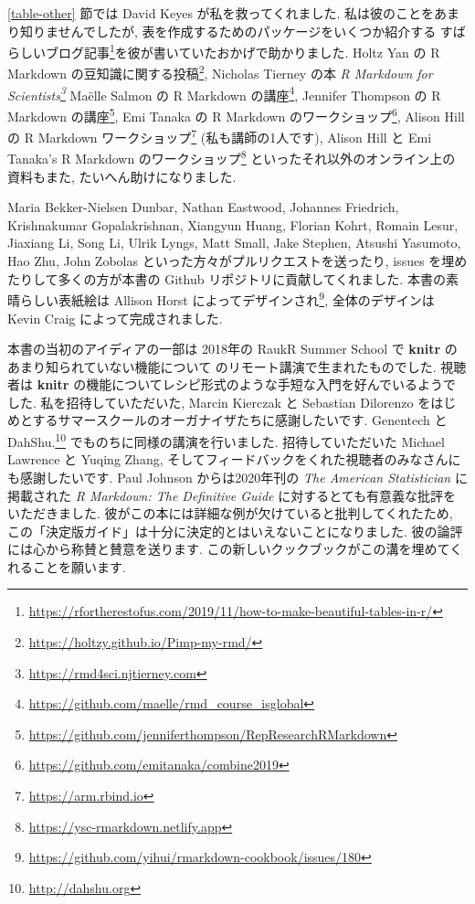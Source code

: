 \documentclass[
  11pt,
  lualatex,
  ja=standard]{bxjsreport}
\renewcommand{\href}[2]{#2\footnote{\url{#1}}}
\begin{document}
\ref{table-other} 節では David Keyes が私を救ってくれました. 私は彼のことをあまり知りませんでしたが, 表を作成するためのパッケージをいくつか紹介する \href{https://rfortherestofus.com/2019/11/how-to-make-beautiful-tables-in-r/}{すばらしいブログ記事}を彼が書いていたおかげで助かりました. Holtz Yan の \href{https://holtzy.github.io/Pimp-my-rmd/}{R Markdown の豆知識に関する投稿}, Nicholas Tierney の本 \emph{\href{https://rmd4sci.njtierney.com}{R Markdown for Scientists}} Maëlle Salmon の \href{https://github.com/maelle/rmd_course_isglobal}{R Markdown の講座}, Jennifer Thompson の \href{https://github.com/jenniferthompson/RepResearchRMarkdown}{R Markdown の講座}, Emi Tanaka の \href{https://github.com/emitanaka/combine2019}{R Markdown のワークショップ}, Alison Hill の \href{https://arm.rbind.io}{R Markdown ワークショップ} (私も講師の1人です), Alison Hill と Emi Tanaka's \href{https://ysc-rmarkdown.netlify.app}{R Markdown のワークショップ} といったそれ以外のオンライン上の資料もまた, たいへん助けになりました.

Maria Bekker-Nielsen Dunbar, Nathan Eastwood, Johannes Friedrich, Krishnakumar Gopalakrishnan, Xiangyun Huang, Florian Kohrt, Romain Lesur, Jiaxiang Li, Song Li, Ulrik Lyngs, Matt Small, Jake Stephen, Atsushi Yasumoto, Hao Zhu, John Zobolas といった方々がプルリクエストを送ったり, issues を埋めたりして多くの方が本書の Github リポジトリに貢献してくれました. 本書の素晴らしい表紙絵は \href{https://github.com/yihui/rmarkdown-cookbook/issues/180}{Allison Horst によってデザインされ}, 全体のデザインは Kevin Craig によって完成されました.

本書の当初のアイディアの一部は 2018年の RaukR Summer School で \textbf{knitr} のあまり知られていない機能について のリモート講演で生まれたものでした. 視聴者は \textbf{knitr} の機能についてレシピ形式のような手短な入門を好んでいるようでした. 私を招待していただいた, Marcin Kierczak と Sebastian Dilorenzo をはじめとするサマースクールのオーガナイザたちに感謝したいです. Genentech と \href{http://dahshu.org}{DahShu.} でものちに同様の講演を行いました. 招待していただいた Michael Lawrence と Yuqing Zhang, そしてフィードバックをくれた視聴者のみなさんにも感謝したいです. Paul Johnson からは2020年刊の \emph{The American Statistician} に掲載された \emph{R Markdown: The Definitive Guide} に対するとても有意義な批評をいただきました. 彼がこの本には詳細な例が欠けていると批判してくれたため, この「決定版ガイド」は十分に決定的とはいえないことになりました. 彼の論評には心から称賛と賛意を送ります. この新しいクックブックがこの溝を埋めてくれることを願います.
\end{document}
